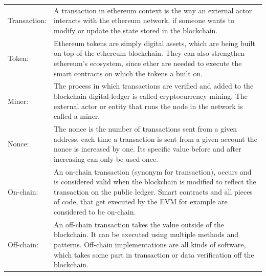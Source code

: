 \begin{center}
	\begin{tabular}{ p{4cm} p{8cm} }
		Transaction:  & A transaction in ethereum context is the way an external actor interacts with the ethereum network, if someone wants to modify or update the state stored in the blockchain. \\
		Token: & Ethereum tokens are simply digital assets, which are being built on top of the ethereum blockchain. They can also strengthen ethereum's ecosystem, since ether are needed to execute the smart contracts on which the tokens a built on. \\
		Miner: & The process in which transactions are verified and added to the blockchain digital ledger is called cryptocurrency mining. The external actor or entity that runs the node in the network is called a miner. \\
		Nonce: & The nonce is the number of transactions sent from a given address, each time a transaction is sent from a given account the nonce is increased by one. Its specific value before and after increasing can only be used once. \\
		On-chain: & An on-chain transaction (synonym for transaction), occurs and is considered valid when the blockchain is modified to reflect the transaction on the public ledger. Smart contracts and all pieces of code, that get executed by the \ac{EVM} for example are considered to be on-chain. \\
		Off-chain: & An off-chain transaction takes the value outside of the blockchain. It can be executed using multiple methods and patterns. Off-chain implementations are all kinds of software, which takes some part in transaction or data verification off the blockchain. \\
	\end{tabular}
\end{center}





